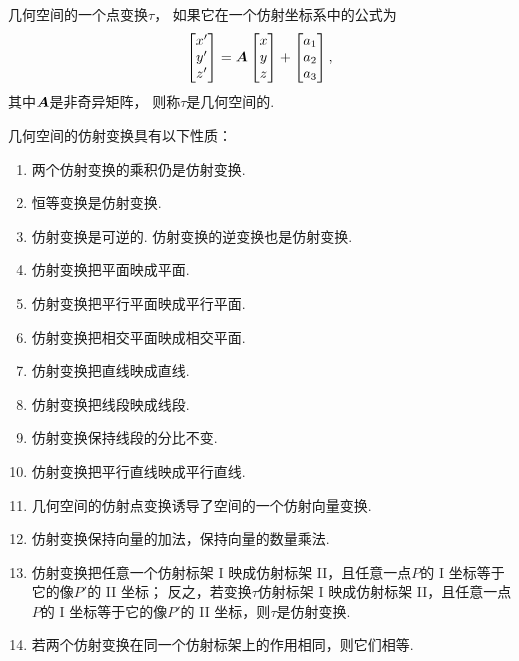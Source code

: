 
\begin{definition}
几何空间的一个点变换\(\tau\)，
如果它在一个仿射坐标系中的公式为\begin{equation*}
	\begin{bmatrix}
		x' \\ y' \\ z'
	\end{bmatrix}
	= \boldsymbol{A}
	\begin{bmatrix}
		x \\ y \\ z
	\end{bmatrix}
	+ \begin{bmatrix}
		a_1 \\ a_2 \\ a_3
	\end{bmatrix},
\end{equation*}
其中\(\boldsymbol{A}\)是非奇异矩阵，
则称\(\tau\)是几何空间的.
\end{definition}

几何空间的仿射变换具有以下性质：\begin{enumerate}
	\item 两个仿射变换的乘积仍是仿射变换.
	\item 恒等变换是仿射变换.
	\item 仿射变换是可逆的.
	仿射变换的逆变换也是仿射变换.
	\item 仿射变换把平面映成平面.
	\item 仿射变换把平行平面映成平行平面.
	\item 仿射变换把相交平面映成相交平面.
	\item 仿射变换把直线映成直线.
	\item 仿射变换把线段映成线段.
	\item 仿射变换保持线段的分比不变.
	\item 仿射变换把平行直线映成平行直线.
	\item 几何空间的仿射点变换诱导了空间的一个仿射向量变换.
	\item 仿射变换保持向量的加法，保持向量的数量乘法.
	\item 仿射变换把任意一个仿射标架 I 映成仿射标架 II，且任意一点\(P\)的 I 坐标等于它的像\(P'\)的 II 坐标；
	反之，若变换\(\tau\)仿射标架 I 映成仿射标架 II，且任意一点\(P\)的 I 坐标等于它的像\(P'\)的 II 坐标，则\(\tau\)是仿射变换.
	\item 若两个仿射变换在同一个仿射标架上的作用相同，则它们相等.
\end{enumerate}

